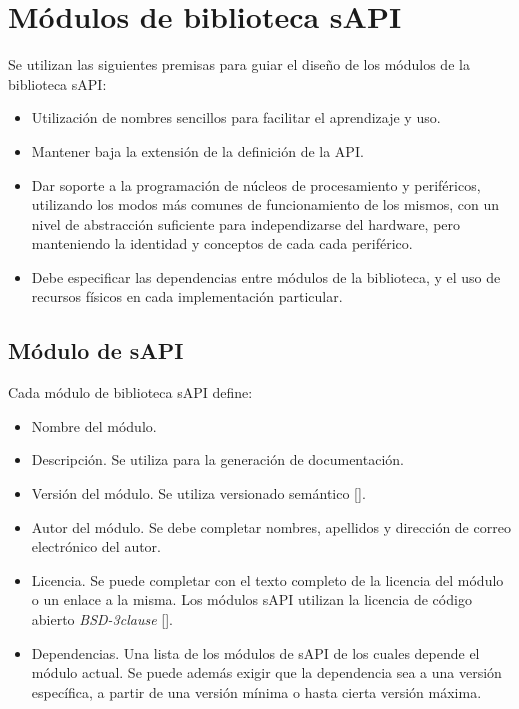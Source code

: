 \section{Módulos de biblioteca sAPI}
\label{sec:modelLibrary}

Se utilizan las siguientes premisas para guiar el diseño de los módulos de la biblioteca sAPI:

\begin{itemize}
\item
Utilización de nombres sencillos para facilitar el aprendizaje y uso.
\item
Mantener baja la extensión de la definición de la API.
\item
Dar soporte a la programación de núcleos de procesamiento y periféricos, utilizando los modos más comunes de funcionamiento de los mismos, con un nivel de abstracción suficiente para independizarse del hardware, pero manteniendo la identidad y conceptos de cada cada periférico.
\item
Debe especificar las dependencias entre módulos de la biblioteca, y el uso de recursos físicos en cada implementación particular.
\end{itemize}

\subsection{Módulo de sAPI}

Cada módulo de biblioteca sAPI define:

\begin{itemize}
\item
Nombre del módulo.
\item
Descripción. Se utiliza para la generación de documentación.
\item
Versión del módulo. Se utiliza versionado semántico [].
\item
Autor del módulo. Se debe completar nombres, apellidos y dirección de correo electrónico del autor. 
\item
Licencia. Se puede completar con el texto completo de la licencia del módulo o un enlace a la misma. Los módulos sAPI utilizan la licencia de código abierto \emph{BSD-3clause} [].
\item
Dependencias. Una lista de los módulos de sAPI de los cuales depende el módulo actual. Se puede además exigir que la dependencia sea a una versión específica, a partir de una versión mínima o hasta cierta versión máxima.
\end{itemize}

